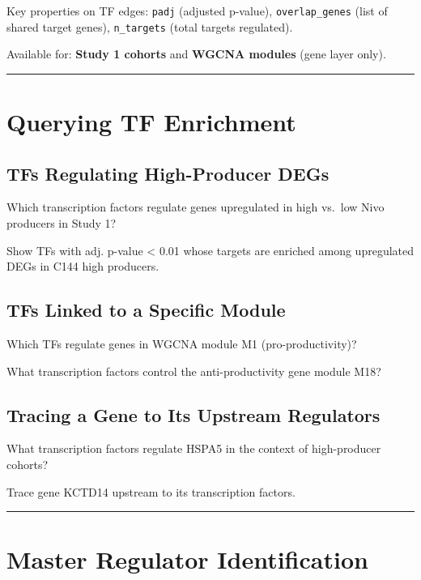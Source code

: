 \documentclass[
  letterpaper,
  oneside,
  open=any]{scrbook}
\begin{document}
Key properties on TF edges: \texttt{padj} (adjusted p-value),
\texttt{overlap\_genes} (list of shared target genes),
\texttt{n\_targets} (total targets regulated).

Available for: \textbf{Study 1 cohorts} and \textbf{WGCNA modules} (gene
layer only).

\begin{center}\rule{0.5\linewidth}{0.5pt}\end{center}

\section{Querying TF Enrichment}\label{querying-tf-enrichment}

\subsection{TFs Regulating High-Producer
DEGs}\label{tfs-regulating-high-producer-degs}

Which transcription factors regulate genes upregulated in high vs.~low
Nivo producers in Study 1?

Show TFs with adj. p-value \textless{} 0.01 whose targets are enriched
among upregulated DEGs in C144 high producers.

\subsection{TFs Linked to a Specific
Module}\label{tfs-linked-to-a-specific-module}

Which TFs regulate genes in WGCNA module M1 (pro-productivity)?

What transcription factors control the anti-productivity gene module
M18?

\subsection{Tracing a Gene to Its Upstream
Regulators}\label{tracing-a-gene-to-its-upstream-regulators}

What transcription factors regulate HSPA5 in the context of
high-producer cohorts?

Trace gene KCTD14 upstream to its transcription factors.

\begin{center}\rule{0.5\linewidth}{0.5pt}\end{center}

\section{Master Regulator
Identification}\label{master-regulator-identification}
\end{document}
